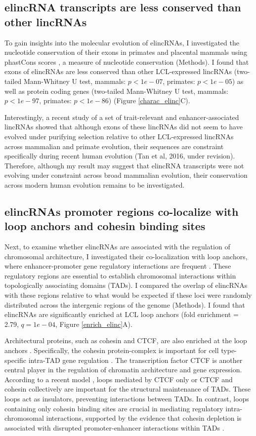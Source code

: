 \documentclass[11pt,a4paper]{report}
\begin{document}
\subsection*{elincRNA transcripts are less conserved than other lincRNAs}

To gain insights into the molecular evolution of elincRNAs, I investigated the nucleotide conservation of their exons in primates and placental mammals using phastCons scores \cite{Siepel2005}⁠, a measure of nucleotide conservation (Methods). I found that exons of elincRNAs are less conserved than other LCL-expressed lincRNAs (two-tailed Mann-Whitney U test, mammals: $p<1e-07$, primates: $p<1e-05$) as well as  protein coding genes (two-tailed Mann-Whitney U test, mammals: $p<1e-97$, primates: $p<1e-86$) (Figure \ref{charac_elinc}C). 

Interestingly, a recent study of a set of trait-relevant and enhancer-associated lincRNAs showed that although exons of these lincRNAs did not seem to have evolved under purifying selection relative to other LCL-expressed lincRNAs across mammalian and primate evolution, their sequences are constraint specifically during recent human evolution (Tan et al, 2016, under revision). Therefore, although my result may suggest that elincRNA transcripts were not evolving under constraint across broad mammalian evolution, their conservation across modern human evolution remains to be investigated.

\subsection*{elincRNAs promoter regions co-localize with loop anchors and cohesin binding sites}

Next, to examine whether elincRNAs are associated with the regulation of chromosomal architecture, I investigated their co-localization with loop anchors, where enhancer-promoter gene regulatory interactions are frequent \cite{Ji2016}. These regulatory regions are essential to establish chromosomal interactions within topologically associating domains (TADs). I compared the overlap of elincRNAs with these regions relative to what would be expected if these loci were randomly distributed across the intergenic regions of the genome (Methods). I found that elincRNAs are significantly enriched at LCL loop anchors (fold enrichment = 2.79, $q=1e-04$, Figure \ref{enrich_elinc}A).


Architectural proteins, such as cohesin and CTCF, are also enriched at the loop anchors \cite{Rao2014}⁠. Specifically, the cohesin protein-complex is important for cell type-specific intra-TAD gene regulation \cite{Hadjur2009}⁠. The transcription factor CTCF is another central player in the regulation of chromatin architecture and gene expression. According to a recent model \cite{Ji2016}⁠, loops mediated by CTCF only or CTCF and cohesin collectively are important for the structural maintenance of TADs. These loops act as insulators, preventing interactions between TADs. In contrast, loops containing only cohesin binding sites are crucial in mediating regulatory intra-chromosomal interactions, supported by the evidence that cohesin depletion is associated with disrupted promoter-enhancer interactions within TADs \cite{Seitan2013}⁠.
\end{document}
